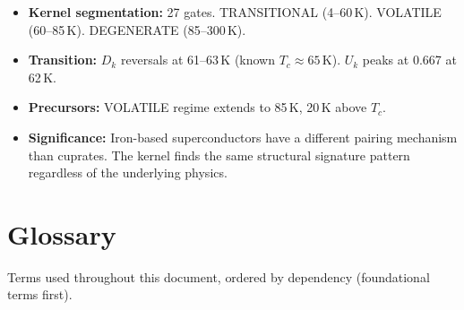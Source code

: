 \documentclass[11pt,letterpaper]{article}
\begin{document}
\begin{itemize}
  \item \textbf{Kernel segmentation:} 27 gates.
    TRANSITIONAL (4--60\,K). VOLATILE (60--85\,K). DEGENERATE (85--300\,K).
  \item \textbf{Transition:} $D_k$ reversals at 61--63\,K (known $T_c \approx 65$\,K).
    $U_k$ peaks at 0.667 at 62\,K.
  \item \textbf{Precursors:} VOLATILE regime extends to 85\,K,
    20\,K above $T_c$.
  \item \textbf{Significance:} Iron-based superconductors have a
    different pairing mechanism than cuprates. The kernel finds the
    same structural signature pattern regardless of the underlying
    physics.
\end{itemize}

\section{Glossary}

Terms used throughout this document, ordered by dependency (foundational
terms first).
\end{document}
